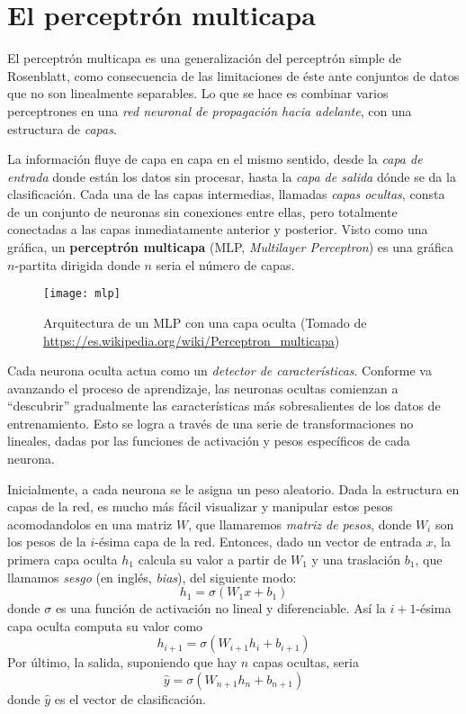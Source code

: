 \blindtext
\section{El perceptrón multicapa}
El perceptrón multicapa es una generalización del perceptrón simple de
Rosenblatt, como consecuencia de las limitaciones de éste ante
conjuntos de datos que no son linealmente separables. Lo que se hace
es combinar varios perceptrones en una \textit{red neuronal de
  propagación hacia adelante}, con una estructura de \textit{capas}.

La información fluye de capa en capa en el mismo sentido, desde la
\textit{capa de entrada} donde están los datos sin procesar, hasta la
\textit{capa de salida} dónde se da la clasificación. Cada una de las capas
intermedias, llamadas \textit{capas ocultas}, consta de un conjunto de
neuronas sin conexiones entre ellas, pero totalmente conectadas a las
capas inmediatamente anterior y posterior. Visto como una gráfica, un
\textbf{perceptrón multicapa} (MLP, \textit{Multilayer Perceptron})
es una gráfica $n$-partita dirigida donde $n$ seria el número de
capas.
\begin{figure}[H]
  \texttt{[image: mlp]} \centering \caption{Arquitectura de
  un MLP con una capa oculta (Tomado de \url{https://es.wikipedia.org/wiki/Perceptron_multicapa})}
\end{figure}
Cada neurona oculta actua como un \textit{detector de
  características}. Conforme va avanzando el proceso de aprendizaje,
las neuronas ocultas comienzan a ``descubrir'' gradualmente las
características más sobresalientes de los datos de entrenamiento.
Esto se logra a través de una serie de transformaciones no lineales,
dadas por las funciones de activación y pesos específicos de cada
neurona.

Inicialmente, a cada neurona se le asigna un peso aleatorio. Dada la
estructura en capas de la red, es mucho más fácil visualizar y
manipular estos pesos acomodandolos en una matriz $W$, que llamaremos
\textit{matriz de pesos}, donde $W_i$ son los pesos de la $i$-ésima
capa de la red. Entonces, dado un vector de entrada $x$, la primera
capa oculta $h_1$ calcula su valor a partir de $W_1$ y una traslación
$b_1$, que llamamos \textit{sesgo} (en inglés, \textit{bias}), del
siguiente modo:
\begin{equation}
  h_1 = \sigma(W_1x + b_1)
\end{equation}
donde $\sigma$ es una función de activación no lineal y
diferenciable. Así la $i+1$-ésima capa oculta computa su valor como
\begin{equation}
  h_{i+1} = \sigma(W_{i+1}h_i + b_{i+1})
\end{equation}
Por último, la salida, suponiendo que hay $n$ capas ocultas, seria
\begin{equation}
  \hat{y} = \sigma{(W_{n+1}h_n + b_{n+1})}
\end{equation}
donde $\hat{y}$ es el vector de clasificación.

